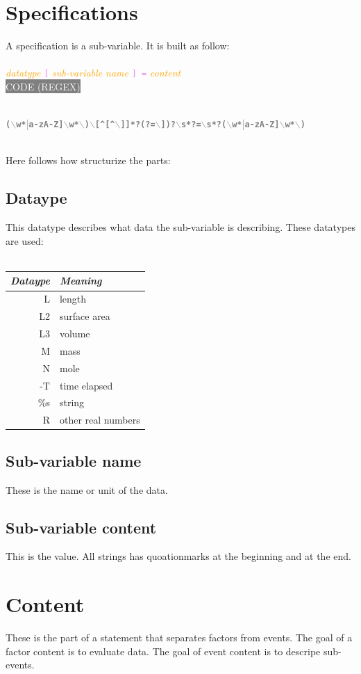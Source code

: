 \documentclass[15pt,a4paper,oneside]{report}
\newcommand{\regex}[1]{{\tiny\\\colorbox{grey}{\textcolor{white}{CODE (REGEX)}\hspace{0.87\textwidth}}}\vspace{-2.2em}\\\begin{framed}\bf{\textcolor{grey}{\vspace{-1.5em}\\\texttt{\small #1}}}\vspace{-0.33em}\end{framed}\vspace{-0.75em}}
\newcommand{\code}[1]{{\textcolor{violet}{\texttt{\small #1}}}}
\newcommand{\comment}[1]{{\textcolor{orange}{\it #1}}}
\begin{document}
\section{Specifications}
A specification is a sub-variable. It is built as follow:\\\\
\comment{datatype} \code{[} \comment{sub-variable name} \code{] =} \comment{content}
\regex{($\backslash$w*$[$a-zA-Z]$\backslash$w*$\backslash$)$\backslash$[\textasciicircum[\textasciicircum$\backslash$]]*?(?=$\backslash$])?$\backslash$s*?=$\backslash$s*?($\backslash$w*$[$a-zA-Z]$\backslash$w*$\backslash$)}
\ 
\\
Here follows how structurize the parts:
\subsection{Dataype}
This datatype describes what data the sub-variable is describing. These datatypes are used:\\\\
\begin{tabular}{r|l}
{\it Dataype} & {\it Meaning}\\
\hline L & length \\
\hline L2 & surface area \\
\hline L3 & volume \\
\hline M & mass \\
\hline N & mole \\
\hline -T & time elapsed\\
\hline \%s & string \\
\hline R & other real numbers\\
\end{tabular}
\subsection{Sub-variable name}
These is the name or unit of the data.
\subsection{Sub-variable  content}
This is the value. All strings has quoationmarks at the beginning and at the end.
\section{Content}
These is the part of a statement that separates factors from events. The goal of a factor content is to evaluate data. The goal of event content is to descripe sub-events.
\newpage
\end{document}
